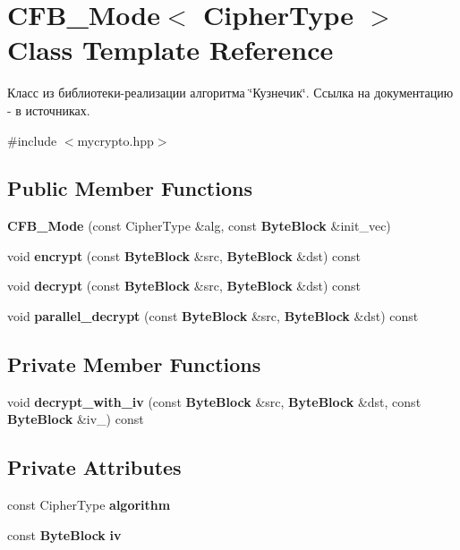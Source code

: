 \section{C\+F\+B\+\_\+\+Mode$<$ Cipher\+Type $>$ Class Template Reference}
\label{class_c_f_b___mode}


Класс из библиотеки-\/реализации алгоритма \char`\"{}Кузнечик\char`\"{}. Ссылка на документацию -\/ в источниках.  




{\ttfamily \#include $<$mycrypto.\+hpp$>$}

\subsection*{Public Member Functions}
\begin{DoxyCompactItemize}
\item 
\textbf{ C\+F\+B\+\_\+\+Mode} (const Cipher\+Type \&alg, const \textbf{ Byte\+Block} \&init\+\_\+vec)
\item 
void \textbf{ encrypt} (const \textbf{ Byte\+Block} \&src, \textbf{ Byte\+Block} \&dst) const
\item 
void \textbf{ decrypt} (const \textbf{ Byte\+Block} \&src, \textbf{ Byte\+Block} \&dst) const
\item 
void \textbf{ parallel\+\_\+decrypt} (const \textbf{ Byte\+Block} \&src, \textbf{ Byte\+Block} \&dst) const
\end{DoxyCompactItemize}
\subsection*{Private Member Functions}
\begin{DoxyCompactItemize}
\item 
void \textbf{ decrypt\+\_\+with\+\_\+iv} (const \textbf{ Byte\+Block} \&src, \textbf{ Byte\+Block} \&dst, const \textbf{ Byte\+Block} \&iv\+\_\+) const
\end{DoxyCompactItemize}
\subsection*{Private Attributes}
\begin{DoxyCompactItemize}
\item 
const Cipher\+Type \textbf{ algorithm}
\item 
const \textbf{ Byte\+Block} \textbf{ iv}
\end{DoxyCompactItemize}


